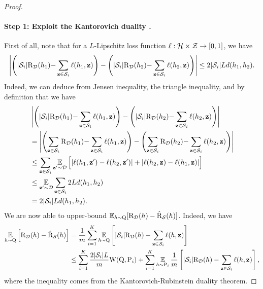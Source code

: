\begin{noaddcontents}
\begin{proof}
    \paragraph{Step 1: Exploit the Kantorovich duality \cite[Remark 6.5]{villani2009optimal}.}
    First of all, note that for a $L$-Lipschitz loss function $\ell: \mathcal{H}\times\mathcal{Z}\to[0,1]$, we have
    \begin{align}
    \left\vert\left( |\mathcal{S}_i|\text{R}_{\mathcal{D}}(h_1){-}\sum_{\mathbf{z}\in\mathcal{S}_i}\ell(h_1, \mathbf{z})\right) - \left( |\mathcal{S}_i|\text{R}_{\mathcal{D}}(h_2){-}\sum_{\mathbf{z}\in\mathcal{S}_i}\ell(h_2, \mathbf{z})\right)\right\vert \le 2|\mathcal{S}_i|Ld(h_1, h_2).\label{eq:proof-supervised-1}
    \end{align}
    Indeed, we can deduce  from Jensen inequality, the triangle inequality, and by definition that we have
    \begin{align*}
    &\left\vert\left( |\mathcal{S}_i|\text{R}_{\mathcal{D}}(h_1){-}\sum_{\mathbf{z}\in\mathcal{S}_i}\ell(h_1, \mathbf{z})\right) - \left( |\mathcal{S}_i|\text{R}_{\mathcal{D}}(h_2){-}\sum_{\mathbf{z}\in\mathcal{S}_i}\ell(h_2, \mathbf{z})\right)\right\vert\\
    &= \left\vert\left(\sum_{\mathbf{z}\in\mathcal{S}_i}\text{R}_{\mathcal{D}}(h_1){-}\sum_{\mathbf{z}\in\mathcal{S}_i}\ell(h_1, \mathbf{z})\right) - \left(\sum_{\mathbf{z}\in\mathcal{S}_i}\text{R}_{\mathcal{D}}(h_2){-}\sum_{\mathbf{z}\in\mathcal{S}_i}\ell(h_2, \mathbf{z})\right)\right\vert\\
    &\le \sum_{\mathbf{z}\in\mathcal{S}_i}\operatorname*{\mathbb{E}}_{\mathbf{z}'\sim\mathcal{D}}\Big[ |\ell(h_1, \mathbf{z}')-\ell(h_2, \mathbf{z}')|+|\ell(h_2, \mathbf{z})-\ell(h_1, \mathbf{z})|\Big]\\
    &\le \operatorname*{\mathbb{E}}_{\mathbf{z}'\sim\mathcal{D}}\sum_{\mathbf{z}\in\mathcal{S}_i} 2Ld(h_1, h_2)\\
    &= 2|\mathcal{S}_i|Ld(h_1, h_2).
    \end{align*}
    We are now able to upper-bound $\operatorname*{\mathbb{E}}_{h\sim\mathrm{Q}}[ \text{R}_{\mathcal{D}}(h) - \hat{\text{R}}_{\mathcal{S}}(h) ]$. 
    Indeed, we have
    \begin{align}
    \operatorname*{\mathbb{E}}_{h\sim\mathrm{Q}}\Big[ \text{R}_{\mathcal{D}}(h) - \hat{\text{R}}_{\mathcal{S}}(h) \Big] &= \frac{1}{m}\sum_{i=1}^{K} \operatorname*{\mathbb{E}}_{h\sim\mathrm{Q}}\left[ |\mathcal{S}_i|\text{R}_{\mathcal{D}}(h) - \sum_{\mathbf{z}\in\mathcal{S}_i}\ell(h, \mathbf{z}) \right]\nonumber\\
    &\le \sum_{i=1}^{K} \frac{2|\mathcal{S}_i|L}{m}\mathrm{W}(\mathrm{Q}, \mathrm{P}_i) + \sum_{i=1}^{K} \operatorname*{\mathbb{E}}_{h\sim\mathrm{P}_i} \frac{1}{m}\left[ |\mathcal{S}_i|\text{R}_{\mathcal{D}}(h) - \sum_{\mathbf{z}\in\mathcal{S}_i} \ell(h, \mathbf{z}) \right],\label{eq:proof-supervised-2}
    \end{align}
    where the inequality comes from the Kantorovich-Rubinstein duality theorem.
    

\end{proof}
\end{noaddcontents}
